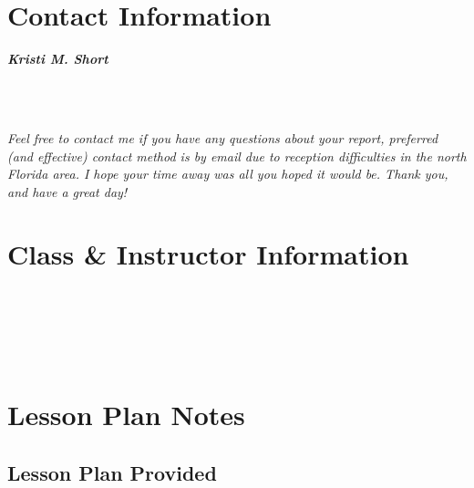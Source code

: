 \documentclass[10pt]{article}
\begin{document}
\section*{Contact Information}

\begin{framed}
\begin{center}
\large{\textit{\textbf{Kristi M. Short}}}
\end{center}

 \\
 \\
\begin{center}
\end{center}

\textit{Feel free to contact me if you have any questions about your report, preferred (and effective) contact method is by email due to reception difficulties in the north Florida area. I hope your time away was all you hoped it would be. Thank you, and have a great day!}

\end{framed}



\section*{Class \& Instructor Information}


\begin{framed}
 \\
 \\
 \\
 \\
\end{framed}


\section*{Lesson Plan Notes}


\subsection*{Lesson Plan Provided}
\end{document}
